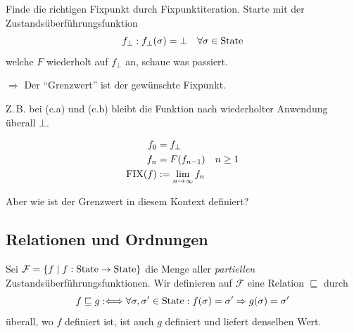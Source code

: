 \begin{remark}[Idee]
    Finde die richtigen Fixpunkt durch Fixpunktiteration. Starte mit der Zustandsüberführungsfunktion \[
    f_{\bot} : f_{\bot}(\sigma) = \bot \quad \forall \sigma \in \operatorname{State}
    \]
    welche $F$ wiederholt auf $f_{\bot}$ an, schaue was passiert.

    $\Rightarrow$ Der ``Grenzwert'' ist der gewünschte Fixpunkt.

    Z.\,B. bei (c.a) und (c.b) bleibt die Funktion nach wiederholter Anwendung überall $\bot$.
\end{remark}

\begin{definition}[Fixpunktoperator]
    \begin{align*}
        f_0 & = f_{\bot} \\
        f_n &= F(f_{n-1}) \quad n \geq 1 \\
        \operatorname{FIX}(f) & := \lim_{n \to \infty} f_n
    \end{align*}

    Aber wie ist der Grenzwert in diesem Kontext definiert?
\end{definition}



\subsection{Relationen und Ordnungen}

\begin{definition}
    Sei $\mathcal{F} = \{ f \;\vert\; f: \operatorname{State} \to \operatorname{State} \}$ die Menge aller \emph{partiellen} Zustandsüberführungsfunktionen. Wir definieren auf $\mathcal{F}$ eine Relation $\sqsubseteq$ durch \[
        f \sqsubseteq g :\Longleftrightarrow \forall \sigma, \sigma' \in \operatorname{State}: f(\sigma) = \sigma' \Rightarrow g(\sigma) = \sigma'
        \]
        \dh{} überall, wo $f$ definiert ist, ist auch $g$ definiert und liefert denselben Wert.
\end{definition}


